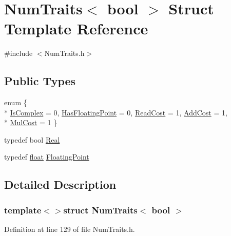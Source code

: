 \hypertarget{struct_num_traits_3_01bool_01_4}{\section{Num\-Traits$<$ bool $>$ Struct Template Reference}
\label{struct_num_traits_3_01bool_01_4}
}


{\ttfamily \#include $<$Num\-Traits.\-h$>$}

\subsection*{Public Types}
\begin{DoxyCompactItemize}
\item 
enum \{ \\*
\hyperlink{struct_num_traits_3_01bool_01_4_ad0fc939106f270fb50ed9fed1c828b8caa45c186d5dc7cd975b4f48c3318b4294}{Is\-Complex} = 0, 
\hyperlink{struct_num_traits_3_01bool_01_4_ad0fc939106f270fb50ed9fed1c828b8ca1ba29c57679f2e9ccff95a8196d46f54}{Has\-Floating\-Point} = 0, 
\hyperlink{struct_num_traits_3_01bool_01_4_ad0fc939106f270fb50ed9fed1c828b8ca5bb4265b6a45d50ad6e18a00cf54d28d}{Read\-Cost} = 1, 
\hyperlink{struct_num_traits_3_01bool_01_4_ad0fc939106f270fb50ed9fed1c828b8cacd06c5367e124541f186f0956051546d}{Add\-Cost} = 1, 
\\*
\hyperlink{struct_num_traits_3_01bool_01_4_ad0fc939106f270fb50ed9fed1c828b8ca8f4a13bb0dd8a752c49aa8591c464ac7}{Mul\-Cost} = 1
 \}
\item 
typedef bool \hyperlink{struct_num_traits_3_01bool_01_4_a3edc5999d3148734b78225951ea7ddcb}{Real}
\item 
typedef \hyperlink{_super_l_u_support_8h_a6a1bb6ed41f44b60e7bd83b0e9945aa7}{float} \hyperlink{struct_num_traits_3_01bool_01_4_af221c4109a329bd362fee9315cddc856}{Floating\-Point}
\end{DoxyCompactItemize}


\subsection{Detailed Description}
\subsubsection*{template$<$$>$struct Num\-Traits$<$ bool $>$}



Definition at line 129 of file Num\-Traits.\-h.



